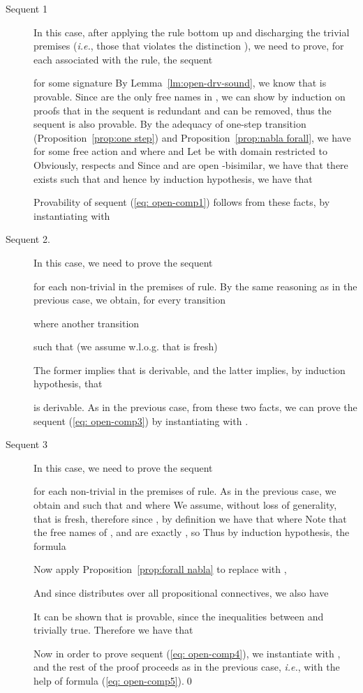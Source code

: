 \documentclass{acmtrans2m}
\newcommand{\ie}{{\em i.e.}}
\begin{document}
\begin{description}
\item[Sequent 1] In this case, after applying the  rule bottom up
and discharging the trivial premises (\ie, those that violates the distinction ), 
we need to prove, for each  associated with the rule, the sequent

for some signature   
By Lemma~\ref{lm:open-drv-sound}, we know that 
 is provable.
Since  are the only free names in , we can show by
induction on proofs that  in the sequent is redundant and can be removed,
thus the sequent
 is also provable.
By the adequacy of one-step transition (Proposition~\ref{prop:one step})
and Proposition~\ref{prop:nabla forall}, we have
 for some free action  and 
where  and 
Let  be  with domain restricted to 
Obviously,  respects  and 
Since  and  are open -bisimilar, we have that
there exists  such that 
and  hence by induction hypothesis, we have that

Provability of sequent (\ref{eq: open-comp1}) follows from these facts,
by instantiating  with 

\item[Sequent 2.]
In this case, we need to prove the sequent

for each non-trivial  in the premises of  rule. 
By the same reasoning as in the previous case, we obtain, for every transition

where  another transition

such that (we assume w.l.o.g. that  is fresh)

The former implies that  is derivable, and the latter
implies, by induction hypothesis, that 

is derivable. 
As in the previous case, from these two facts, we can prove the sequent (\ref{eq: open-comp3})
by instantiating  with .


\item[Sequent 3] In this case, we need to prove the sequent

for each non-trivial  in the premises of  rule. As in the previous case, we obtain
 and  such that
 and 
where  We assume, without loss of generality, that  is fresh, therefore
since , by definition we have that 
where 
Note that the free names of ,  and  are exactly
, so 
Thus by induction hypothesis, the formula

Now apply Proposition~\ref{prop:forall nabla} to replace  with ,

And since  distributes over all propositional connectives, we also have

It can be shown that  is provable, 
since the inequalities between  and  trivially true. 
Therefore we have that

Now in order to prove sequent (\ref{eq: open-comp4}), we instantiate
 with , and the rest of the proof proceeds as in the previous case,
\ie, with the help of formula (\ref{eq: open-comp5}).\qed
\end{description}
\end{document}
